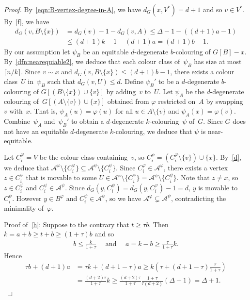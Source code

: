 \documentclass[11pt]{article}
\theoremstyle{plain}
\numberwithin{equation}{section}
\begin{document}
\begin{proof}
    By~\eqref{eqn:B-vertex-degree-in-A}, we have $d_G(x,V^*)  =d+1$ and so $v \in V^*$.
	  By~\ref{f}, we have
    \begin{align*}
    d_G(v,B \setminus \{x\}) & = d_G(v) - 1-d_G(v,A) \le \Delta -1- ((d+1)a - 1)\\
    & \le (d+1)k-1 - (d+1)a = (d+1)b-1.
    \end{align*}
    By our assumption let $\psi_B$ be an equitable $d$-degenerate $b$-colouring of $G[B]- x$.
    By~\ref{dfn:nearequiable2}, we deduce that each colour class of~$\psi_B$ has size at most $\lceil n/k \rceil$.
    Since $v\sim x$ and $d_G(v,B \setminus \{x\})\le (d+1)b-1$, there exists a colour class~$U$ in~$\psi_B$ such that $d_G(v,U) \le d$.
    Define $\psi_B'$ to be a $d$-degenerate $b$-colouring of $G[(B \setminus \{x\}) \cup \{v\}]$ by adding~$v$ to~$U$.
    Let $\psi_A$ be the $d$-degenerate colouring of~$G[(A \setminus \{v\}) \cup \{x\}]$ obtained from $\varphi$ restricted on~$A$ by swapping~$v$ with~$x$.
    That is, $\psi_A(u) = \varphi(u)$ for all $u \in A \setminus \{v\}$ and $\psi_A(x) = \varphi(v)$.
    Combine~$\psi_A$ and~$\psi_B'$ to obtain a $d$-degenerate $k$-colouring~$\psi$ of~$G$.
    Since $G$ does not have an equitable $d$-degenerate $k$-colouring, we deduce that $\psi$ is near-equitable.

Let $C_i^{\varphi}= V$ be the colour class containing~$v$,    so $C_i^{\psi} = (C_i^{\varphi} \setminus \{v\}) \cup \{x\}$.
By~\ref{d}, we deduce that  $\mathcal{A}^{\varphi} \setminus \{C_i^{\varphi} \} \subseteq \mathcal{A}^{\psi} \setminus \{C_i^{\psi} \}$.
Since  $C_i^{\varphi} \in  \mathcal{A}^{\varphi}$, there exists a vertex $z \in C_i^{\varphi}$  that is movable to some $U \in \mathcal{A}^{\varphi} \setminus \{C_i^{\varphi}\} = \mathcal{A}^{\psi} \setminus \{C_i^{\psi}\}$.
Note that $z\neq x$, so $z \in C_i^\psi$ and $C_i^{\psi} \in  \mathcal{A}^{\psi}$.
Since $d_{G}(y,C_i^{\psi}) =  d_G(y,C_i^{\varphi}) -1 =d$, $y$ is movable to~$C_i^{\psi}$.
However $y \in B^{\varphi}$ and $C_i^{\psi} \in \mathcal{A}^{\psi}$, so we have $\mathcal{A}^{\varphi} \subsetneq \mathcal{A}^{\psi}$, contradicting the minimality of~$\varphi$.

	Proof of~\ref{h}:  	 Suppose to the contrary that $t  \ge   \tau b$.
	Then  $k =a+b \ge t+b \ge  (1+\tau)b$ and so
	\begin{align*}
	b \le \frac{k}{1+\tau}\quad \text{ and }\quad	a  = k-b  \ge  \frac{\tau}{1+\tau} k.
	\end{align*}
Hence
\begin{align}
\tau b + (d+1) a 	&=  \tau k + (d+1-\tau) a
	\ge  k\left(\tau + (d+1-\tau)\frac{\tau}{1+\tau}\right) \nonumber \\
	&= \frac{(d+2)\tau}{1+ \tau} k
	 \ge  \frac{(d+2)\tau}{1+ \tau}  \frac{1+\tau}{\tau(d+2)} (\Delta+1)
	= \Delta+1.      \label{eqn:taub}
\end{align}


\end{proof}
\end{document}
